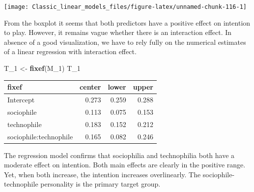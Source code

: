 \documentclass[]{svmono}
\newenvironment{Shaded}{\begin{snugshade}}{\end{snugshade}}
\newcommand{\KeywordTok}[1]{\textcolor[rgb]{0.13,0.29,0.53}{\textbf{#1}}}
\newcommand{\DataTypeTok}[1]{\textcolor[rgb]{0.13,0.29,0.53}{#1}}
\newcommand{\DecValTok}[1]{\textcolor[rgb]{0.00,0.00,0.81}{#1}}
\newcommand{\StringTok}[1]{\textcolor[rgb]{0.31,0.60,0.02}{#1}}
\newcommand{\OperatorTok}[1]{\textcolor[rgb]{0.81,0.36,0.00}{\textbf{#1}}}
\newcommand{\NormalTok}[1]{#1}
\begin{document}
\texttt{[image: Classic\_linear\_models\_files/figure-latex/unnamed-chunk-116-1]}

From the boxplot it seems that both predictors have a positive effect on
intention to play. However, it remains vague whether there is an
interaction effect. In absence of a good visualization, we have to rely
fully on the numerical estimates of a linear regression with interaction
effect.

\begin{Shaded}
\end{Shaded}

\begin{Shaded}
\begin{Highlighting}[]
\NormalTok{T_}\DecValTok{1}\NormalTok{ <-}\StringTok{ }\KeywordTok{fixef}\NormalTok{(M_}\DecValTok{1}\NormalTok{)}
\NormalTok{T_}\DecValTok{1}
\end{Highlighting}
\end{Shaded}

\begin{longtable}[]{@{}lrrr@{}}
\toprule
fixef & center & lower & upper\tabularnewline
\midrule
\endhead
Intercept & 0.273 & 0.259 & 0.288\tabularnewline
sociophile & 0.113 & 0.075 & 0.153\tabularnewline
technophile & 0.183 & 0.152 & 0.212\tabularnewline
sociophile:technophile & 0.165 & 0.082 & 0.246\tabularnewline
\bottomrule
\end{longtable}

The regression model confirms that sociophilia and technophilia both
have a moderate effect on intention. Both main effects are clearly in
the positive range. Yet, when both increase, the intention increases
overlinearly. The sociophile-technophile personality is the primary
target group.
\end{document}
